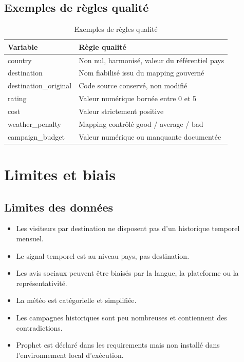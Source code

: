 \documentclass[11pt,a4paper]{report}
\begin{document}
\section{Exemples de règles qualité}

\begin{table}[H]
\centering
\caption{Exemples de règles qualité}
\begin{tabularx}{\textwidth}{lX}
\toprule
\textbf{Variable} & \textbf{Règle qualité} \\
\midrule
country & Non nul, harmonisé, valeur du référentiel pays \\
destination & Nom fiabilisé issu du mapping gouverné \\
destination\_original & Code source conservé, non modifié \\
rating & Valeur numérique bornée entre 0 et 5 \\
cost & Valeur strictement positive \\
weather\_penalty & Mapping contrôlé good / average / bad \\
campaign\_budget & Valeur numérique ou manquante documentée \\
\bottomrule
\end{tabularx}
\end{table}

\chapter{Limites et biais}

\section{Limites des données}

\begin{itemize}[leftmargin=*]
    \item Les visiteurs par destination ne disposent pas d'un historique temporel mensuel.
    \item Le signal temporel est au niveau pays, pas destination.
    \item Les avis sociaux peuvent être biaisés par la langue, la plateforme ou la représentativité.
    \item La météo est catégorielle et simplifiée.
    \item Les campagnes historiques sont peu nombreuses et contiennent des contradictions.
    \item Prophet est déclaré dans les requirements mais non installé dans l'environnement local d'exécution.
\end{itemize}
\end{document}
